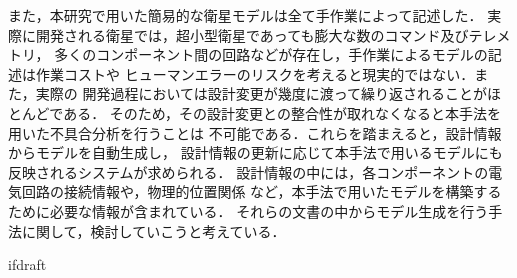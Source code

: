 \documentclass[11pt]{jsreport}
\begin{document}
また，本研究で用いた簡易的な衛星モデルは全て手作業によって記述した．
実際に開発される衛星では，超小型衛星であっても膨大な数のコマンド及びテレメトリ，%
多くのコンポーネント間の回路などが存在し，手作業によるモデルの記述は作業コストや
ヒューマンエラーのリスクを考えると現実的ではない．また，実際の
開発過程においては設計変更が幾度に渡って繰り返されることがほとんどである．
そのため，その設計変更との整合性が取れなくなると本手法を用いた不具合分析を行うことは
不可能である．これらを踏まえると，設計情報からモデルを自動生成し，
設計情報の更新に応じて本手法で用いるモデルにも反映されるシステムが求められる．
設計情報の中には，各コンポーネントの電気回路の接続情報や，物理的位置関係
など，本手法で用いたモデルを構築するために必要な情報が含まれている．
それらの文書の中からモデル生成を行う手法に関して，検討していこうと考えている．



\begin{comment}
\section{まとめ}



また，故障診断のコンテキストによってどこまで掘り下げるべきか使い分けるべきである
\cite{Ontology1998}ことを書く．

一方で，人工衛星は内部のコンポーネントが非常に密集しているおり，人間が設計時に考慮した
意図したつながりだけでなく，意図しないつながりも多く存在する．
このような意図しないつながりによって，波及効果が発生することが衛星内部の理解が
困難になり
\end{comment}

\expandafter\ifx\csname ifdraft\endcsname\relax
  
\end{document}
